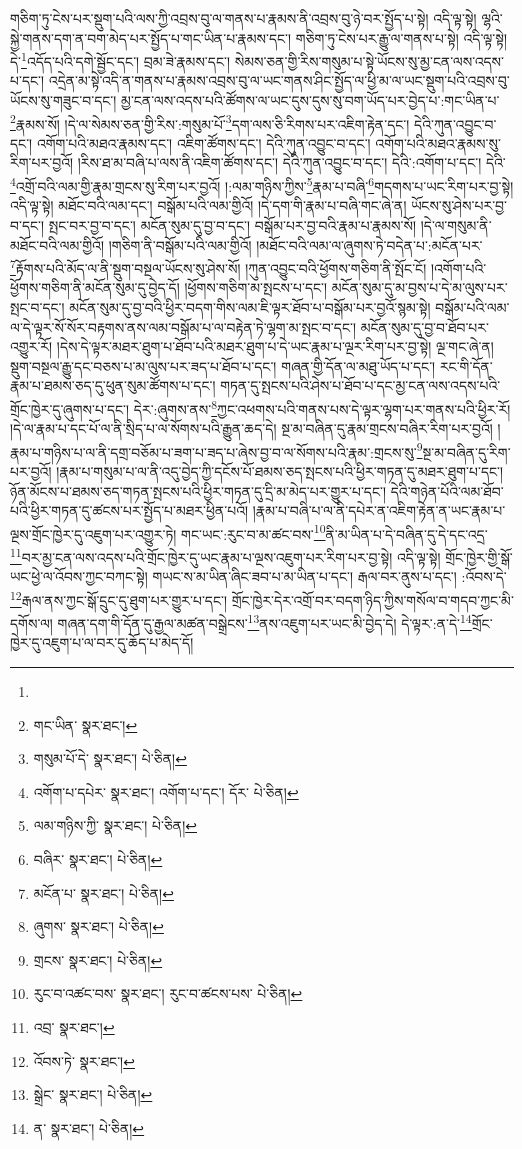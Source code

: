 གཅིག་ཏུ་ངེས་པར་སྡུག་པའི་ལས་ཀྱི་འབྲས་བུ་ལ་གནས་པ་རྣམས་ནི་འབྲས་བུ་ཉེ་བར་སྤྱོད་པ་སྟེ། འདི་ལྟ་སྟེ། ལྷའི་སྐྱེ་གནས་དག་ན་བག་མེད་པར་སྤྱོད་པ་གང་ཡིན་པ་རྣམས་དང་། གཅིག་ཏུ་ངེས་པར་རྒྱུ་ལ་གནས་པ་སྟེ། འདི་ལྟ་སྟེ། དེ་\footnote{}འདོད་པའི་དགེ་སྦྱོང་དང་། བྲམ་ཟེ་རྣམས་དང་། སེམས་ཅན་གྱི་རིས་གསུམ་པ་སྟེ་ཡོངས་སུ་མྱ་ངན་ལས་འདས་པ་དང་། འདྲེན་མ་སྟེ་འདི་ན་གནས་པ་རྣམས་འབྲས་བུ་ལ་ཡང་གནས་ཤིང་སྤྱོད་ལ་ཕྱི་མ་ལ་ཡང་སྡུག་པའི་འབྲས་བུ་ཡོངས་སུ་གཟུང་བ་དང་། མྱ་ངན་ལས་འདས་པའི་ཚོགས་ལ་ཡང་དུས་དུས་སུ་བག་ཡོད་པར་བྱེད་པ་:གང་ཡིན་པ་\footnote{གང་ཡིན་  སྣར་ཐང་། }རྣམས་སོ། །དེ་ལ་སེམས་ཅན་གྱི་རིས་:གསུམ་པོ་\footnote{གསུམ་པོ་དེ་  སྣར་ཐང་།  པེ་ཅིན། }དག་ལས་ཅི་རིགས་པར་འཇིག་རྟེན་དང་། དེའི་ཀུན་འབྱུང་བ་དང་། འགོག་པའི་མཐའ་རྣམས་དང་། འཇིག་ཚོགས་དང་། དེའི་ཀུན་འབྱུང་བ་དང་། འགོག་པའི་མཐའ་རྣམས་སུ་རིག་པར་བྱའོ། །རིས་ཐ་མ་བཞི་པ་ལས་ནི་འཇིག་ཚོགས་དང་། དེའི་ཀུན་འབྱུང་བ་དང་། དེའི་:འགོག་པ་དང་། དེའི་\footnote{འགོག་པ་དཔེར་  སྣར་ཐང་། འགོག་པ་དང་། དོར་  པེ་ཅིན། }འགྲོ་བའི་ལམ་གྱི་རྣམ་གྲངས་སུ་རིག་པར་བྱའོ། །:ལམ་གཉིས་ཀྱིས་\footnote{ལམ་གཉིས་ཀྱི་  སྣར་ཐང་།  པེ་ཅིན། }རྣམ་པ་བཞི་\footnote{བཞིར་  སྣར་ཐང་།  པེ་ཅིན། }གདགས་པ་ཡང་རིག་པར་བྱ་སྟེ། འདི་ལྟ་སྟེ། མཐོང་བའི་ལམ་དང་། བསྒོམ་པའི་ལམ་གྱིའོ། །དེ་དག་གི་རྣམ་པ་བཞི་གང་ཞེ་ན། ཡོངས་སུ་ཤེས་པར་བྱ་བ་དང་། སྤང་བར་བྱ་བ་དང་། མངོན་སུམ་དུ་བྱ་བ་དང་། བསྒོམ་པར་བྱ་བའི་རྣམ་པ་རྣམས་སོ། །དེ་ལ་གསུམ་ནི་མཐོང་བའི་ལམ་གྱིའོ། །གཅིག་ནི་བསྒོམ་པའི་ལམ་གྱིའོ། །མཐོང་བའི་ལམ་ལ་ཞུགས་ཏེ་བདེན་པ་:མངོན་པར་\footnote{མངོན་པ་  སྣར་ཐང་།  པེ་ཅིན། }རྟོགས་པའི་མོད་ལ་ནི་སྡུག་བསྔལ་ཡོངས་སུ་ཤེས་སོ། །ཀུན་འབྱུང་བའི་ཕྱོགས་གཅིག་ནི་སྤོང་ངོ། །འགོག་པའི་ཕྱོགས་གཅིག་ནི་མངོན་སུམ་དུ་བྱེད་དོ། །ཕྱོགས་གཅིག་མ་སྤངས་པ་དང་། མངོན་སུམ་དུ་མ་བྱས་པ་དེ་མ་ལུས་པར་སྤང་བ་དང་། མངོན་སུམ་དུ་བྱ་བའི་ཕྱིར་བདག་གིས་ལམ་ཇི་ལྟར་ཐོབ་པ་བསྒོམ་པར་བྱའོ་སྙམ་སྟེ། བསྒོམ་པའི་ལམ་ལ་དེ་ལྟར་སོ་སོར་བརྟགས་ནས་ལམ་བསྒོམ་པ་ལ་བརྟེན་ཏེ་ལྷག་མ་སྤང་བ་དང་། མངོན་སུམ་དུ་བྱ་བ་ཐོབ་པར་འགྱུར་རོ། །དེས་དེ་ལྟར་མཐར་ཐུག་པ་ཐོབ་པའི་མཐར་ཐུག་པ་དེ་ཡང་རྣམ་པ་ལྔར་རིག་པར་བྱ་སྟེ། ལྔ་གང་ཞེ་ན། སྡུག་བསྔལ་རྒྱུ་དང་བཅས་པ་མ་ལུས་པར་ཟད་པ་ཐོབ་པ་དང་། གཞན་གྱི་དོན་ལ་མཐུ་ཡོད་པ་དང་། རང་གི་དོན་རྣམ་པ་ཐམས་ཅད་དུ་ཕུན་སུམ་ཚོགས་པ་དང་། གཏན་དུ་སྤངས་པའི་ཤེས་པ་ཐོབ་པ་དང་མྱ་ངན་ལས་འདས་པའི་གྲོང་ཁྱེར་དུ་ཞུགས་པ་དང་། དེར་:ཞུགས་ནས་\footnote{ཞུགས་  སྣར་ཐང་།  པེ་ཅིན། }ཀྱང་འཕགས་པའི་གནས་པས་དེ་ལྟར་ལྷག་པར་གནས་པའི་ཕྱིར་རོ། །དེ་ལ་རྣམ་པ་དང་པོ་ལ་ནི་སྲིད་པ་ལ་སོགས་པའི་རྒྱུན་ཆད་དེ། སྔ་མ་བཞིན་དུ་རྣམ་གྲངས་བཞིར་རིག་པར་བྱའོ། །རྣམ་པ་གཉིས་པ་ལ་ནི་དགྲ་བཅོམ་པ་ཟག་པ་ཟད་པ་ཞེས་བྱ་བ་ལ་སོགས་པའི་རྣམ་:གྲངས་སུ་\footnote{གྲངས་  སྣར་ཐང་།  པེ་ཅིན། }སྔ་མ་བཞིན་དུ་རིག་པར་བྱའོ། །རྣམ་པ་གསུམ་པ་ལ་ནི་འདུ་བྱེད་ཀྱི་དངོས་པོ་ཐམས་ཅད་སྤངས་པའི་ཕྱིར་གཏན་དུ་མཐར་ཐུག་པ་དང་། ཉོན་མོངས་པ་ཐམས་ཅད་གཏན་སྤངས་པའི་ཕྱིར་གཏན་དུ་དྲི་མ་མེད་པར་གྱུར་པ་དང་། དེའི་གཉེན་པོའི་ལམ་ཐོབ་པའི་ཕྱིར་གཏན་དུ་ཚངས་པར་སྤྱོད་པ་མཐར་ཕྱིན་པའོ། །རྣམ་པ་བཞི་པ་ལ་ནི་དཔེར་ན་འཇིག་རྟེན་ན་ཡང་རྣམ་པ་ལྔས་གྲོང་ཁྱེར་དུ་འཇུག་པར་འགྱུར་ཏེ། གང་ཡང་:རུང་བ་མ་ཚང་བས་\footnote{རུང་བ་འཚང་བས་  སྣར་ཐང་། རུང་བ་ཚངས་པས་  པེ་ཅིན། }ནི་མ་ཡིན་པ་དེ་བཞིན་དུ་དེ་དང་འདྲ་\footnote{འབྲ་  སྣར་ཐང་། }བར་མྱ་ངན་ལས་འདས་པའི་གྲོང་ཁྱེར་དུ་ཡང་རྣམ་པ་ལྔས་འཇུག་པར་རིག་པར་བྱ་སྟེ། འདི་ལྟ་སྟེ། གྲོང་ཁྱེར་གྱི་སྒོ་ཡང་ཕྱེ་ལ་འོབས་ཀྱང་བཀང་སྟེ། གཡང་ས་མ་ཡིན་ཞིང་ཟབ་པ་མ་ཡིན་པ་དང་། རྒལ་བར་ནུས་པ་དང་། :འོབས་དེ་\footnote{འོབས་ཏེ་  སྣར་ཐང་། }རྒལ་ནས་ཀྱང་སྒོ་དྲུང་དུ་ཐུག་པར་གྱུར་པ་དང་། གྲོང་ཁྱེར་དེར་འགྲོ་བར་བདག་ཉིད་ཀྱིས་གསོལ་བ་གདབ་ཀྱང་མི་དགོས་ལ། གཞན་དག་གི་དོན་དུ་རྒྱལ་མཚན་བསྒྲེངས་\footnote{སྒྲེང་  སྣར་ཐང་།  པེ་ཅིན། }ནས་འཇུག་པར་ཡང་མི་བྱེད་དེ། དེ་ལྟར་:ན་དེ་\footnote{ན་  སྣར་ཐང་།  པེ་ཅིན། }གྲོང་ཁྱེར་དུ་འཇུག་པ་ལ་བར་དུ་ཆོད་པ་མེད་དོ། 
